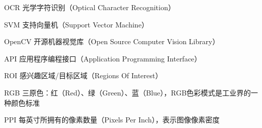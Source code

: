 ﻿\begin{denotation}
  \item[OCR] 光学字符识别（Optical Character Recognition）
  \item[SVM] 支持向量机（Support Vector Machine）
  \item[OpenCV] 开源机器视觉库（Open Source Computer Vision Library）
  \item[API] 应用程序编程接口（Application Programming Interface）
  \item[ROI] 感兴趣区域/目标区域（Regions Of Interest）
  \item[RGB] 三原色：红（Red）、绿（Green）、蓝（Blue），RGB色彩模式是工业界的一种颜色标准
  \item[PPI] 每英寸所拥有的像素数量（Pixels Per Inch），表示图像像素密度
\end{denotation}
